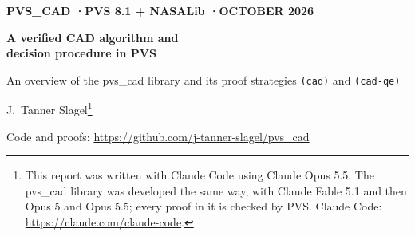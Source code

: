 \documentclass[11pt]{article}
\begin{document}
{\sffamily\small\bfseries\color{moss}PVS\_CAD \quad·\quad PVS 8.1 + NASALib \quad·\quad OCTOBER 2026}\par\vspace{6pt}
{\fontsize{24}{29}\selectfont\bfseries A verified CAD algorithm and\\ decision procedure in PVS}\par\vspace{8pt}
{\large\color{muted}An overview of the pvs\_cad library and its proof strategies \texttt{(cad)} and \texttt{(cad-qe)}}\par\vspace{8pt}
{\large J.~Tanner Slagel{\renewcommand\thefootnote{*}\footnote{This report was written with Claude Code using Claude Opus 5.5. The pvs\_cad library was developed the same way, with Claude Fable 5.1 and then Opus 5 and Opus 5.5; every proof in it is checked by PVS. Claude Code: \url{https://claude.com/claude-code}.}}}\par\vspace{2pt}
{\small\color{muted}Code and proofs: \url{https://github.com/j-tanner-slagel/pvs_cad}}\par\vspace{10pt}
\end{document}
